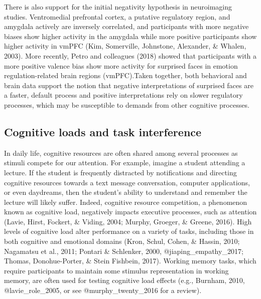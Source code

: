 \documentclass[man]{apa6}
\begin{document}
There is also support for the initial negativity hypothesis in neuroimaging studies. Ventromedial prefrontal cortex, a putative regulatory region, and amygdala actively are inversely correlated, and participants with more negative biases show higher activity in the amygdala while more positive participants show higher activity in vmPFC (Kim, Somerville, Johnstone, Alexander, \& Whalen, 2003). More recently, Petro and colleagues (2018) showed that participants with a more positive valence bias show more activity for surprised faces in emotion regulation-related brain regions (vmPFC).Taken together, both behavioral and brain data support the notion that negative interpretations of surprised faces are a faster, default process and positive interpretations rely on slower regulatory processes, which may be susceptible to demands from other cognitive processes.

\hypertarget{cognitive-loads-and-task-interference}{%
\subsection{Cognitive loads and task interference}\label{cognitive-loads-and-task-interference}}

In daily life, cognitive resources are often shared among several processes as stimuli compete for our attention. For example, imagine a student attending a lecture. If the student is frequently distracted by notifications and directing cognitive resources towards a text message conversation, computer applications, or even daydreams, then the student's ability to understand and remember the lecture will likely suffer. Indeed, cognitive resource competition, a phenomenon known as cognitive load, negatively impacts executive processes, such as attention (Lavie, Hirst, Fockert, \& Viding, 2004; Murphy, Groeger, \& Greene, 2016). High levels of cognitive load alter performance on a variety of tasks, including those in both cognitive and emotional domains (Kron, Schul, Cohen, \& Hassin, 2010; Nagamatsu et al., 2011; Pontari \& Schlenker, 2000, @jiaping\_empathy\_2017; Thomas, Donohue-Porter, \& Stein Fishbein, 2017). Working memory tasks, which require participants to maintain some stimulus representation in working memory, are often used for testing cognitive load effects (e.g., Burnham, 2010, @lavie\_role\_2005, or see @murphy\_twenty\_2016 for a review).
\end{document}
